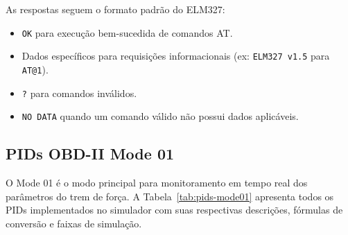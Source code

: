 As respostas seguem o formato padrão do ELM327:
\begin{itemize}
    \item \texttt{OK} para execução bem-sucedida de comandos AT.
    \item Dados específicos para requisições informacionais (ex: \texttt{ELM327 v1.5} para \texttt{AT@1}).
    \item \texttt{?} para comandos inválidos.
    \item \texttt{NO DATA} quando um comando válido não possui dados aplicáveis.
\end{itemize}

\subsection{PIDs OBD-II Mode 01}

O Mode 01 é o modo principal para monitoramento em tempo real dos parâmetros do trem de força. A Tabela~\ref{tab:pids-mode01} apresenta todos os PIDs implementados no simulador com suas respectivas descrições, fórmulas de conversão e faixas de simulação.

